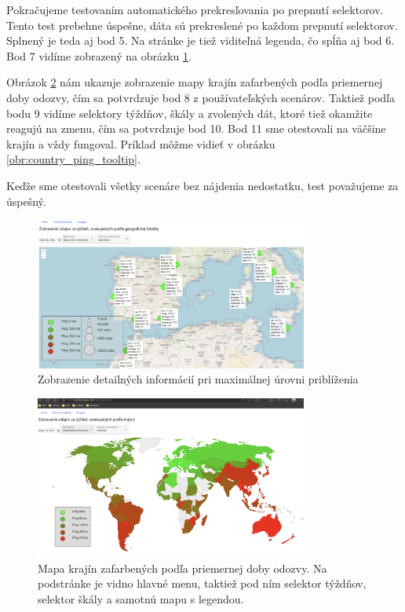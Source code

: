 Pokračujeme testovaním automatického prekresľovania po prepnutí selektorov. Tento test prebehne úspešne, dáta sú prekreslené po každom prepnutí selektorov.
Splnený je teda aj bod 5. Na stránke je tiež viditeľná legenda, čo spĺňa aj bod 6. Bod 7 vidíme zobrazený na obrázku \ref{obr:max_zoom}. 

Obrázok \ref{obr:country_ping_info} nám ukazuje zobrazenie mapy krajín zafarbených podľa priemernej doby odozvy, čím sa potvrdzuje bod 8 z používateľských
scenárov. Taktiež podľa bodu 9 vidíme selektory týždňov, škály a zvolených dát, ktoré tiež okamžite reagujú na zmenu, čím sa potvrdzuje bod 10. 
Bod 11 sme otestovali na väčšine krajín a vždy fungoval. Príklad môžme vidieť v obrázku \ref{obr:country_ping_tooltip}.

Keďže sme otestovali všetky scenáre bez nájdenia nedostatku, test považujeme za úspešný.

\begin{figure}
    \centerline{\includegraphics[width=0.8\textwidth]{images/max_zoom}}
    \caption[Zobrazenie detailných informácií pri maximálnej úrovni priblíženia]{Zobrazenie detailných informácií pri maximálnej úrovni priblíženia}
    \label{obr:max_zoom}
\end{figure}
\label{test_interface}



\begin{figure}
    \centerline{\includegraphics[width=0.8\textwidth]{images/country-ping-info}}
    \caption[Mapa krajín zafarbených podľa priemernej doby odozvy]{Mapa krajín zafarbených podľa priemernej doby odozvy. Na podstránke je vidno hlavné menu, 
    taktiež pod ním selektor týždňov, selektor škály a samotnú mapu s legendou.}
    \label{obr:country_ping_info}
\end{figure}


